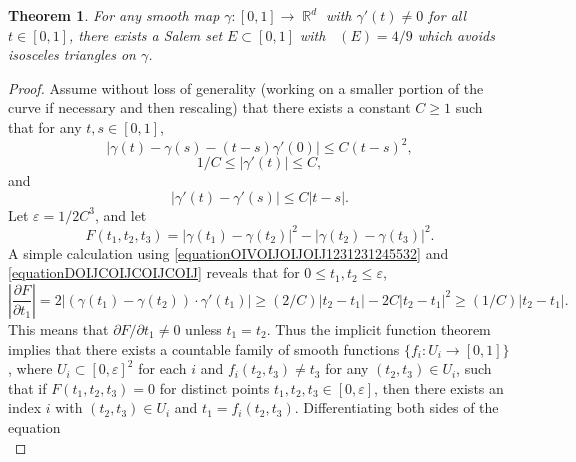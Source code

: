\documentclass[dvipsnames,letterpaper,12pt]{article}
\numberwithin{equation}{section}
\DeclareMathOperator{\fordim}{\dim_{\mathbb{F}}}
\DeclareMathOperator{\RR}{\mathbb{R}}
\newtheorem{theorem}{Theorem}
\numberwithin{theorem}{section}
\begin{document}
\begin{theorem}
    For any smooth map $\gamma: [0,1] \to \RR^d$ with $\gamma'(t) \neq 0$ for all $t \in [0,1]$, there exists a Salem set $E \subset [0,1]$ with $\fordim(E) = 4/9$ which avoids isosceles triangles on $\gamma$.
\end{theorem}
\begin{proof}
    Assume without loss of generality (working on a smaller portion of the curve if necessary and then rescaling) that there exists a constant $C \geq 1$ such that for any $t,s \in [0,1]$,
    \begin{equation} \label{equationOIVOIJOIJOIJ1231231245532}
        |\gamma(t) - \gamma(s) - (t - s)\gamma'(0)| \leq C (t - s)^2,
    \end{equation}
    \begin{equation} \label{equationDOIJCOIJCOIJCOIJ}
        1/C \leq |\gamma'(t)| \leq C,
    \end{equation}
    and
    \begin{equation} \label{equationCIOJAOIVJVOIJioj1312421541}
        |\gamma'(t) - \gamma'(s)| \leq C |t - s|.
    \end{equation}
    Let $\varepsilon = 1/2C^3$, and let
    \begin{equation}
        F(t_1,t_2,t_3) = |\gamma(t_1) - \gamma(t_2)|^2 - |\gamma(t_2) - \gamma(t_3)|^2.
    \end{equation}
    A simple calculation using \eqref{equationOIVOIJOIJOIJ1231231245532} and \eqref{equationDOIJCOIJCOIJCOIJ} reveals that for $0 \leq t_1,t_2 \leq \varepsilon$,
    \begin{equation} \label{equationCOIJAWOIJCAWOIJWOAI2112412}
        \left| \frac{\partial F}{\partial t_1} \right| = 2 \left| (\gamma(t_1) - \gamma(t_2)) \cdot \gamma'(t_1) \right| \geq (2/C) |t_2 - t_1| - 2C |t_2 - t_1|^2 \geq (1/C) |t_2 - t_1|.
    \end{equation}
    This means that $\partial F / \partial t_1 \neq 0$ unless $t_1 = t_2$. Thus the implicit function theorem implies that there exists a countable family of smooth functions $\{ f_i: U_i \to [0,1] \}$, where $U_i \subset [0,\varepsilon]^2$ for each $i$ and $f_i(t_2,t_3) \neq t_3$ for any $(t_2,t_3) \in U_i$, such that if $F(t_1,t_2,t_3) = 0$ for distinct points $t_1,t_2,t_3 \in [0,\varepsilon]$, then there exists an index $i$ with $(t_2,t_3) \in U_i$ and $t_1 = f_i(t_2,t_3)$. Differentiating both sides of the equation
    \begin{equation}

\end{equation}
\end{proof}
\end{document}
